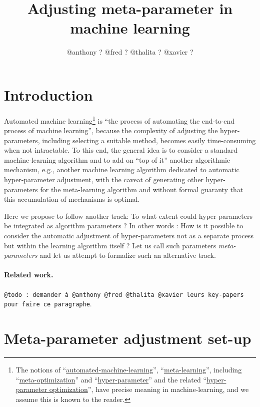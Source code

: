 \documentclass{article}
\begin{document}
\title{Adjusting meta-parameter in machine learning}
\author{@anthony ? @fred ? @thalita ? @xavier ?}

\section{Introduction}

Automated machine learning\footnote{The notions of ``\href{https://en.wikipedia.org/wiki/Automated\_machine\_learning}{automated-machine-learning}'', 
``\href{https://en.wikipedia.org/wiki/Meta_learning_(computer_science)}{meta-learning}'', including ``\href{https://en.wikipedia.org/wiki/Meta-optimization}{meta-optimization}'' and ``\href{https://en.wikipedia.org/wiki/Hyperparameter_(machine_learning)}{hyper-parameter}'' and the related ``\href{http://neupy.com/2016/12/17/hyperparameter\_optimization\_for\_neural\_networks.html}{hyper-parameter optimization}'', have precise meaning in machine-learning, and we assume this is known to the reader.} is ``the process of automating the end-to-end process of machine learning'', because the complexity of adjusting the hyper-parameters, including selecting a suitable method, becomes easily time-consuming when not intractable. To this end, the general idea is to consider a standard machine-learning algorithm and to add on ``top of it'' another algorithmic mechanism, e.g., another machine learning algorithm dedicated to automatic hyper-parameter adjustment, with the caveat of generating other hyper-parameters for the meta-learning algorithm and without formal guaranty that this accumulation of mechanisms is optimal.

Here we propose to follow another track: To what extent could hyper-parameters be integrated as algorithm parameters ? In other words : How is it possible to consider the automatic adjustment of hyper-parameters not as a separate process but within the learning algorithm itself ? Let us call such parameters {\em meta-parameters} and let us attempt to formalize such an alternative track.

\paragraph{Related work.} {\tt @todo : demander à  @anthony @fred @thalita @xavier leurs key-papers pour faire ce paragraphe}.

\section{Meta-parameter adjustment set-up}
\end{document}
